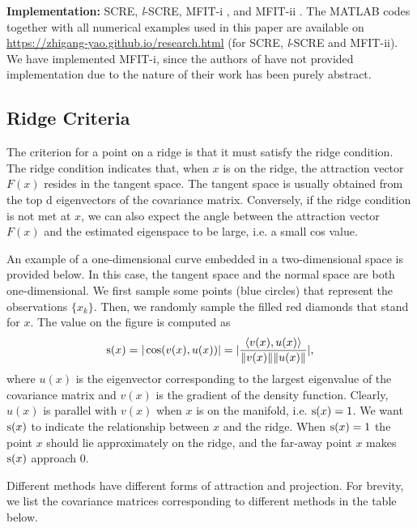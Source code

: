 \documentclass[aos,preprint]{imsart}
\theoremstyle{remark}
\begin{document}
{\bf Implementation:} {\rm SCRE}, {\it l}-SCRE, MFIT-i \citep{fefferman2018fitting}, and MFIT-ii \citep{yao2019manifold}. The MATLAB codes together with all numerical examples used in this paper are available on \url{https://zhigang-yao.github.io/research.html} (for {\rm SCRE}, {\it l}-SCRE and MFIT-ii). We have implemented MFIT-i,  since the authors of \cite{fefferman2018fitting} have not provided implementation due to the nature of their work has been purely abstract. 


\subsection{Ridge Criteria}
The criterion for a point on a ridge is that it must satisfy the ridge condition. The ridge condition indicates that, when $x$ is on the ridge, the attraction vector $F(x)$ resides in the tangent space. The tangent space is usually obtained from the top d eigenvectors of the covariance matrix. Conversely, if the ridge condition is not met at $x$, we can also expect the angle between the attraction vector $F(x)$ and the estimated eigenspace to be large, i.e. a small cos value. 

An example of a one-dimensional curve embedded in a two-dimensional space is provided below. In this case, the tangent space and the normal space are both one-dimensional.
We first sample some points (blue circles) that represent the observations $\{x_k\}$. Then, we randomly sample the filled red diamonds that stand for $x$. The value on the figure is computed as
\[
{\rm s}(x) =  |\cos(v(x),u(x))| = |\frac{\langle v(x), u(x) \rangle}{\|v(x)\|\|u(x)\|}|,
\]
where $u(x)$ is the eigenvector corresponding to the largest eigenvalue of the covariance matrix and $v(x)$ is the gradient of the density function. Clearly, $u(x)$ is parallel with $v(x)$ when $x$ is on the manifold, i.e. ${\rm s}(x)=1$. We want ${\rm s}(x)$ to indicate the relationship between $x$ and the ridge. When ${\rm s}(x)=1$ the point $x$ should lie approximately on the ridge, and the far-away point $x$ makes ${\rm s}(x)$ approach $0$.

Different methods have different forms of attraction and projection. For brevity, we list the covariance matrices corresponding to different methods in the table below.
% 
 
\end{document}
